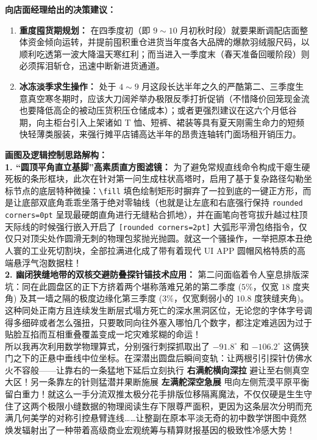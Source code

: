 \documentclass[12pt, a4paper]{ctexrep}
\begin{document}
\vspace{0.2cm}
\textbf{向店面经理给出的决策建议：}
\begin{enumerate}
    \item \textbf{重度囤货期规划：} 在四季度初（即 $9{\sim}10$ 月初秋时段）就要果断调配店面整体资金倾向运转，并提前囤积重仓进货当年度各大品牌的爆款羽绒服尺码，以顺利吃透第一波大降温天寒红利；而当进入一季度末（春天准备回暖阶段）则必须挥泪斩仓，迅速中断新进货通道。
    \item \textbf{冰冻淡季求生操作：} 处于 $4 \sim 9$ 月这段长达半年之久的严酷第二、三季度生意真空寒冬期时，应该大刀阔斧举办极限反季打折促销（不惜降价回笼现金流也要降低高企的被动压货积压仓储成本）；或者更强烈建议在这六个月低谷期，向主柜台引入上架诸如 T 恤、短裤、裙装等具有夏天刚需生命力的短频快轻薄类服装，来强行摊平店铺高达半年的昂贵连轴转门面场租开销压力。
\end{enumerate}

\vspace{0.6cm}

{\small\color{blue!70!black}
\textbf{画图及逻辑控制思路解构：}\\
\textbf{1. “圆顶平角直立基脚”高素质直方图滤镜：} 为了避免常规直线命令构成干瘪生硬死板的条形框块，此次在针对第一问生成柱状高塔时，启用了基于复杂路径勾勒坐标节点的底层特种微操：\texttt{\textbackslash fill} 填色绘制矩形时摒弃了一拉到底的一键正方形，而是让底部双底角乖乖坐落于绝对零轴线（也就是让左底和右底强行保持 \texttt{rounded corners=0pt} 呈现最硬朗直角进行无缝粘合抓地），并在画笔向苍穹拔升越过柱顶天际线的时候强行嵌入开启了 \texttt{[rounded corners=2pt]} 大弧形平滑包络指令，仅仅只对顶尖处作圆滑无刺的物理包浆抛光抛圆。就这一个骚操作，一举把原本丑绝人寰的工业死切割块，全部拉满进化成了带有着现代 UI APP 圆帽风格特质的高端悬浮气泡数据柱！\\
\textbf{2. 幽闭狭缝地带的双核交避防叠探针锚技术应用：} 第二问面临着令人窒息排版深坑：同在此圆盘区的正下方挤着两个堪称落难兄弟的第二季度 ($5\%$，仅宽 $18$ 度夹角) 及其一墙之隔的极度边缘化第三季度 ($3\%$，仅宽剩弱小的 $10.8$ 度狭缝夹角)。这种同处正南方且连续发生断层式塌方死亡的深水黑洞区位，无论您的字体字号调得多细碎或者怎么强扭，只要敢同向往外塞入哪怕几个数字，都注定难逃因为过于贴脸互掐而互相重叠覆盖变成一坨灾难浆糊的命运！\\
所以我再次利用数学物理算式，分别强行刺探抓取出了 $-91.8^\circ$ 和 $-106.2^\circ$ 这俩狭门之下的正悬中垂线中位坐标。在深潜出圆盘后瞬间变轨：让两根引引探针仿佛水火不容般——让靠右的一条猛地下延后立刻执行 \textbf{右满舵横向深拉} 避让至右侧真空大区！另一条靠左的针则猛潜并果断施展 \textbf{左满舵深空急展} 甩向左侧荒漠平原平衡留白重力！就这么一手分流双推太极分花手排版位移隔离魔法，不仅仅硬是生生守住了这两个极限小缝数据的物理阅读生存下限尊严面积，更因为这条层次分明而充满几何美学的对称引控悬臂连线……让整副在原本平淡无奇的初中数学饼图中竟然焕发辐射出了一种带着高级商业宏观统筹与精算财报基因的极致性冷感大势！
}
\end{document}
